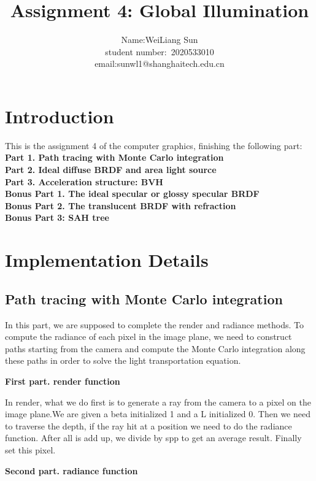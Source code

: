 \documentclass[acmtog]{acmart}
\title{Assignment 4: {Global Illumination}}
\author{Name:\quad WeiLiang Sun  \\ student number:\ 2020533010
\\email:\quad sunwl1@shanghaitech.edu.cn}
\begin{document}
\maketitle

\vspace*{2 ex}

\section{Introduction}

This is the assignment 4 of the computer graphics, finishing the following part:\\
\textbf{Part 1. Path tracing with Monte Carlo integration} \\
\textbf{Part 2. Ideal diffuse BRDF and area light source} \\
\textbf{Part 3. Acceleration structure: BVH} \\
\textbf{Bonus Part 1. The ideal specular or glossy specular BRDF} \\
\textbf{Bonus Part 2. The translucent BRDF with refraction} \\
\textbf{Bonus Part 3: SAH tree}

\section{Implementation Details}

\subsection{Path tracing with Monte Carlo integration}

In this part, we are supposed to complete the render and radiance methods. To compute the radiance of each pixel in the image plane, we need to construct paths starting from the camera and compute the Monte Carlo integration along these paths in order to solve the light transportation equation.

\textbf{First part. render function}

In render, what we do first is to generate a ray from the camera to a pixel on the image plane.We are given a beta initialized 1 and a L initialized 0. Then we need to traverse the depth, if the ray hit at a 
position we need to do the radiance function. After all is add up, we divide by spp to get an average result. Finally set this pixel.

\textbf{Second part. radiance function}
\end{document}
